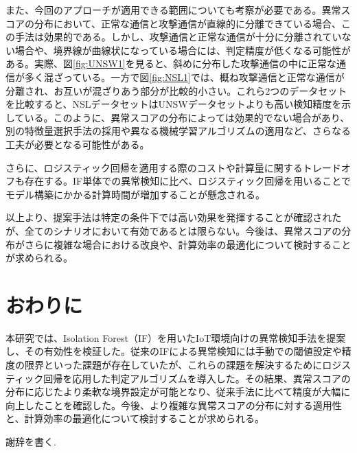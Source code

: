 \documentclass{css}
\begin{document}
また、今回のアプローチが適用できる範囲についても考察が必要である。異常スコアの分布において、正常な通信と攻撃通信が直線的に分離できている場合、この手法は効果的である。しかし、攻撃通信と正常な通信が十分に分離されていない場合や、境界線が曲線状になっている場合には、判定精度が低くなる可能性がある。実際、図\ref{fig:UNSW1}を見ると、斜めに分布した攻撃通信の中に正常な通信が多く混ざっている。一方で図\ref{fig:NSL1}では、概ね攻撃通信と正常な通信が分離され、お互いが混ざりあう部分が比較的小さい。これら2つのデータセットを比較すると、NSLデータセットはUNSWデータセットよりも高い検知精度を示している。このように、異常スコアの分布によっては効果的でない場合があり、別の特徴量選択手法の採用や異なる機械学習アルゴリズムの適用など、さらなる工夫が必要となる可能性がある。

さらに、ロジスティック回帰を適用する際のコストや計算量に関するトレードオフも存在する。IF単体での異常検知に比べ、ロジスティック回帰を用いることでモデル構築にかかる計算時間が増加することが懸念される。

以上より、提案手法は特定の条件下では高い効果を発揮することが確認されたが、全てのシナリオにおいて有効であるとは限らない。今後は、異常スコアの分布がさらに複雑な場合における改良や、計算効率の最適化について検討することが求められる。

\section{おわりに}
本研究では、Isolation Forest（IF）を用いたIoT環境向けの異常検知手法を提案し、その有効性を検証した。従来のIFによる異常検知には手動での閾値設定や精度の限界といった課題が存在していたが、これらの課題を解決するためにロジスティック回帰を応用した判定アルゴリズムを導入した。その結果、異常スコアの分布に応じたより柔軟な境界設定が可能となり、従来手法に比べて精度が大幅に向上したことを確認した。今後、より複雑な異常スコアの分布に対する適用性と、計算効率の最適化について検討することが求められる。

\begin{acknowledgment}
謝辞を書く.
\end{acknowledgment}



\end{document}
